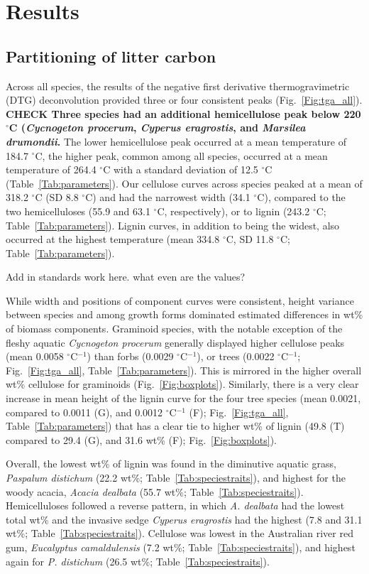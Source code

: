 \documentclass{article}
\begin{document}
\section{Results}
\subsection{Partitioning of litter carbon}
Across all species, the results of the negative first derivative thermogravimetric (DTG) deconvolution provided three or four consistent peaks (Fig.~\ref{Fig:tga_all}). \textbf{CHECK Three species had an additional hemicellulose peak below 220 $^{\circ}$C (\textit{Cycnogeton procerum}, \textit{Cyperus eragrostis}, and \textit{Marsilea drumondii}.} The lower hemicellulose peak occurred at a mean temperature of 184.7 $^\circ$C, the higher peak, common among all species, occurred at a mean temperature of 264.4 $^{\circ}$C with a standard deviation of 12.5 $^{\circ}$C (Table~\ref{Tab:parameters}). Our cellulose curves across species peaked at a mean of 318.2 $^{\circ}$C (SD 8.8 $^{\circ}$C) and had the narrowest width (34.1 $^{\circ}$C), compared to the two hemicelluloses (55.9 and 63.1 $^{\circ}$C, respectively), or to lignin (243.2 $^{\circ}$C; Table~\ref{Tab:parameters}). Lignin curves, in addition to being the widest, also occurred at the highest temperature (mean 334.8 $^{\circ}$C, SD 11.8 $^{\circ}$C; Table~\ref{Tab:parameters}). 

Add in standards work here. what even are the values? 


While width and positions of component curves were consistent, height variance between species and among growth forms dominated estimated differences in wt\% of biomass components. Graminoid species, with the notable exception of the fleshy aquatic \textit{Cycnogeton procerum} generally displayed higher cellulose peaks (mean 0.0058 $^\circ$C$^{-1}$) than forbs (0.0029 $^\circ$C$^{-1}$), or trees (0.0022 $^\circ$C$^{-1}$; Fig.~\ref{Fig:tga_all}, Table~\ref{Tab:parameters}). This is mirrored in the higher overall wt\% cellulose for graminoids (Fig.~\ref{Fig:boxplots}). Similarly, there is a very clear increase in mean height of the lignin curve for the four tree species (mean 0.0021, compared to 0.0011 (G), and 0.0012 $^\circ$C$^{-1}$ (F); Fig.~\ref{Fig:tga_all}, Table~\ref{Tab:parameters}) that has a clear tie to higher wt\% of lignin (49.8 (T) compared to 29.4 (G), and 31.6 wt\% (F); Fig.~\ref{Fig:boxplots}). 

Overall, the lowest wt\% of lignin was found in the diminutive aquatic grass, \textit{Paspalum distichum} (22.2 wt\%; Table~\ref{Tab:speciestraits}), and highest for the woody acacia, \textit{Acacia dealbata} (55.7 wt\%; Table~\ref{Tab:speciestraits}). Hemicelluloses followed a reverse pattern, in which \textit{A. dealbata} had the lowest total wt\% and the invasive sedge \textit{Cyperus eragrostis} had the highest (7.8 and 31.1 wt\%; Table~\ref{Tab:speciestraits}). Cellulose was lowest in the Australian river red gum, \textit{Eucalyptus camaldulensis} (7.2 wt\%; Table~\ref{Tab:speciestraits}), and highest again for \textit{P. distichum} (26.5 wt\%; Table~\ref{Tab:speciestraits}). 
\end{document}
